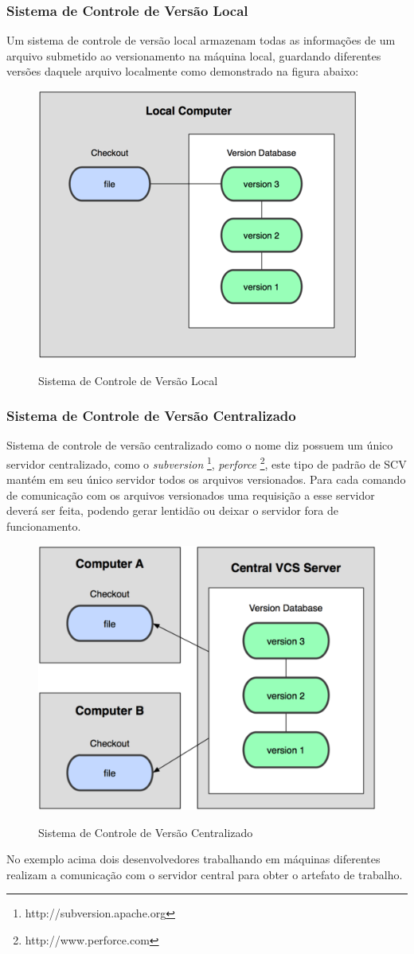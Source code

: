 \subsubsection{Sistema de Controle de Versão Local}
Um sistema de controle de versão local	armazenam todas as informações de um arquivo submetido ao versionamento na máquina local, guardando diferentes versões daquele arquivo localmente como demonstrado na figura abaixo:
\begin{figure}[tbh]
\centering
\caption[Sistema de Controle de Versão Local]{Sistema de Controle de Versão Local}
\includegraphics[width=0.4\linewidth]{./images/scvlocal}
\label{fig:SCVLocal}
\end{figure}
\subsubsection{Sistema de Controle de Versão Centralizado} Sistema de controle de versão centralizado como o nome diz possuem um único servidor centralizado, como o \textit{subversion} \footnote{http://subversion.apache.org}, \textit{perforce} \footnote{http://www.perforce.com}, este tipo de padrão de SCV mantém em seu único servidor todos os arquivos versionados. Para cada comando de comunicação com os arquivos versionados uma requisição a esse servidor deverá ser feita, podendo gerar lentidão ou deixar o servidor fora de funcionamento.
\begin{figure}[tbh]
\centering
\caption[Sistema de Controle de Versão Centralizado]{Sistema de Controle de Versão Centralizado}
\includegraphics[width=0.4\linewidth]{./images/scvcentral}
\label{fig:SCVCentral}
\end{figure}
No exemplo acima dois desenvolvedores trabalhando em máquinas diferentes realizam a comunicação com o servidor central para obter o artefato de trabalho.	
